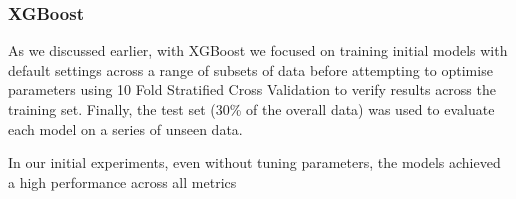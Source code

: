  \newpage

\subsubsection{XGBoost}
\label{sec:xgboost}

As we discussed earlier, with XGBoost we focused on training initial models with default settings across a range of subsets of data before attempting to optimise parameters using 10 Fold Stratified Cross Validation to verify results across the training set. Finally, the test set (30\% of the overall data) was used to evaluate each model on a series of unseen data.

In our initial experiments, even without tuning parameters, the models achieved a high performance across all metrics



